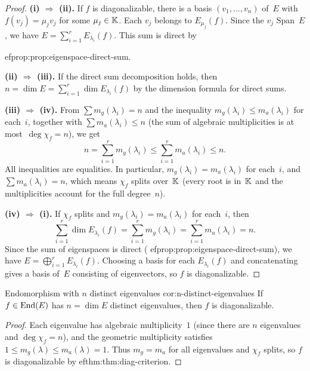 \begin{proof}
\textbf{(i) $\Rightarrow$ (ii).}\;
If $f$ is diagonalizable, there is a basis $(v_1,\ldots,v_n)$ of~$E$
with $f(v_j) = \mu_j v_j$ for some $\mu_j\in{\mathbb{K}}$.  Each $v_j$ belongs
to $E_{\mu_j}(f)$.  Since the $v_j$ Span~$E$, we have
$E = \sum_{i=1}^r E_{\lambda_i}(f)$.  This sum is direct by

ef{prop:prop:eigenspace-direct-sum}.

\textbf{(ii) $\Rightarrow$ (iii).}\;
If the direct sum decomposition holds, then
$n = \dim E = \sum_{i=1}^r \dim E_{\lambda_i}(f)$ by the dimension
formula for direct sums.

\textbf{(iii) $\Rightarrow$ (iv).}\;
From $\sum m_g(\lambda_i) = n$ and the inequality
$m_g(\lambda_i) \leq m_a(\lambda_i)$ for each~$i$, together with
$\sum m_a(\lambda_i) \leq n$ (the sum of algebraic multiplicities is
at most~$\deg\chi_f = n$), we get
\[
  n = \sum_{i=1}^r m_g(\lambda_i) \leq \sum_{i=1}^r m_a(\lambda_i) \leq n.
\]
All inequalities are equalities.  In particular,
$m_g(\lambda_i) = m_a(\lambda_i)$ for each~$i$, and
$\sum m_a(\lambda_i) = n$, which means $\chi_f$ splits over~${\mathbb{K}}$
(every root is in~${\mathbb{K}}$ and the multiplicities account for the full
degree~$n$).

\textbf{(iv) $\Rightarrow$ (i).}\;
If $\chi_f$ splits and $m_g(\lambda_i) = m_a(\lambda_i)$ for each~$i$,
then
\[
  \sum_{i=1}^r \dim E_{\lambda_i}(f)
  = \sum_{i=1}^r m_g(\lambda_i)
  = \sum_{i=1}^r m_a(\lambda_i) = n.
\]
Since the sum of eigenspaces is direct (
ef{prop:prop:eigenspace-direct-sum}),
we have $E = \bigoplus_{i=1}^r E_{\lambda_i}(f)$.  Choosing a basis
for each $E_{\lambda_i}(f)$ and concatenating gives a basis of~$E$
consisting of eigenvectors, so $f$ is diagonalizable.
\end{proof}

\begin{corollary}{Endomorphism with $n$ distinct eigenvalues}%
{cor:n-distinct-eigenvalues}
If $f\in\operatorname{End}(E)$ has $n = \dim E$ distinct eigenvalues, then $f$ is
diagonalizable.
\end{corollary}

\begin{proof}
Each eigenvalue has algebraic multiplicity~$1$ (since there are $n$
eigenvalues and $\deg\chi_f = n$), and the geometric multiplicity
satisfies $1 \leq m_g(\lambda) \leq m_a(\lambda) = 1$.  Thus
$m_g = m_a$ for all eigenvalues and $\chi_f$ splits, so $f$ is
diagonalizable by 
ef{thm:thm:diag-criterion}.
\end{proof}

